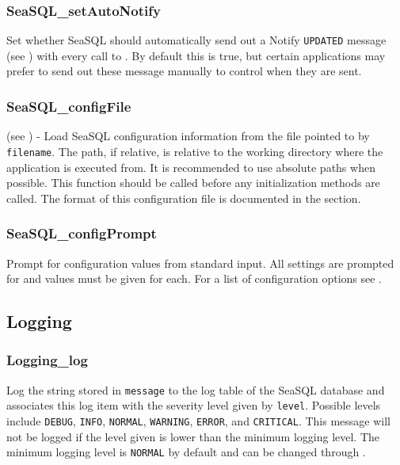 \subsubsection{SeaSQL\_setAutoNotify} \label{apiseasqlnotify}
 Set whether SeaSQL should
automatically send out a Notify \texttt{UPDATED} message (see
) with every call to
. By default this is true,
but certain applications may prefer to send out these message manually to
control when they are sent.

\subsubsection{SeaSQL\_configFile} \label{apiseasqlconfigfile}
 \deprecated{} (see
) - Load SeaSQL
configuration information from the file pointed to by \texttt{filename}. The
path, if relative, is relative to the working directory where the application is
executed from. It is recommended to use absolute paths when possible. This
function should be called before any initialization methods are called. The
format of this configuration file is documented in the
 section.

\subsubsection{SeaSQL\_configPrompt} \label{apiseasqlconfigprompt}
 Prompt for configuration values from
standard input. All settings are prompted for and values must be given for
each. For a list of configuration options see
.


\subsection{Logging} \label{apilogging}
\subsubsection{Logging\_log} \label{apilogginglog}
 Log the string stored in
\texttt{message} to the log table of the SeaSQL database and associates this log
item with the severity level given by \texttt{level}. Possible levels include
\texttt{DEBUG}, \texttt{INFO}, \texttt{NORMAL}, \texttt{WARNING},
\texttt{ERROR}, and \texttt{CRITICAL}. This message will not be logged if the
level given is lower than the minimum logging level. The minimum logging level
is \texttt{NORMAL} by default and can be changed through
.

